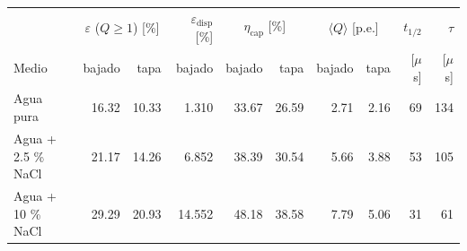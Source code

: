 \begin{tabular}{lrrrrrrrrr}
\toprule
 & \multicolumn{2}{c}{$\varepsilon$ ($Q\geq1$) [\%]} & $\varepsilon_\text{disp}$ [\%] & \multicolumn{2}{c}{$\eta_\text{cap}$ [\%]} & \multicolumn{2}{c}{$\langle Q\rangle$ [p.e.]} & $t_{1/2}$ & $\tau$ \\
Medio & bajado & tapa & bajado & bajado & tapa & bajado & tapa & [$\mu$s] & [$\mu$s] \\
\midrule
Agua pura & 16.32 & 10.33 & 1.310 & 33.67 & 26.59 & 2.71 & 2.16 & 69 & 134 \\
Agua + 2.5 \% NaCl & 21.17 & 14.26 & 6.852 & 38.39 & 30.54 & 5.66 & 3.88 & 53 & 105 \\
Agua + 10 \% NaCl & 29.29 & 20.93 & 14.552 & 48.18 & 38.58 & 7.79 & 5.06 & 31 & 61 \\
\bottomrule
\end{tabular}
